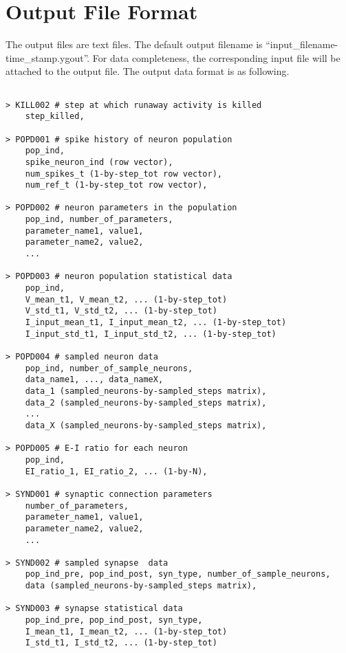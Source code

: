 \documentclass{article}
\begin{document}
\section{Output File Format}
The output files are text files.
The default output filename is ``input\_filename-time\_stamp.ygout''.
For data completeness, the corresponding input file will be attached to the output file.
The output data format is as following.
\begin{lstlisting}

> KILL002 # step at which runaway activity is killed
	step_killed,

> POPD001 # spike history of neuron population
	pop_ind,
	spike_neuron_ind (row vector),
	num_spikes_t (1-by-step_tot row vector),
	num_ref_t (1-by-step_tot row vector),

> POPD002 # neuron parameters in the population
	pop_ind, number_of_parameters,
	parameter_name1, value1,
	parameter_name2, value2,
	...

> POPD003 # neuron population statistical data
	pop_ind,
	V_mean_t1, V_mean_t2, ... (1-by-step_tot)
	V_std_t1, V_std_t2, ... (1-by-step_tot)
	I_input_mean_t1, I_input_mean_t2, ... (1-by-step_tot)
	I_input_std_t1, I_input_std_t2, ... (1-by-step_tot)
	
> POPD004 # sampled neuron data
	pop_ind, number_of_sample_neurons,
	data_name1, ..., data_nameX,
	data_1 (sampled_neurons-by-sampled_steps matrix),
	data_2 (sampled_neurons-by-sampled_steps matrix),
	...
	data_X (sampled_neurons-by-sampled_steps matrix),

> POPD005 # E-I ratio for each neuron
	pop_ind,
	EI_ratio_1, EI_ratio_2, ... (1-by-N),

> SYND001 # synaptic connection parameters
	number_of_parameters,
	parameter_name1, value1,
	parameter_name2, value2,
	...

> SYND002 # sampled synapse  data
	pop_ind_pre, pop_ind_post, syn_type, number_of_sample_neurons,
	data (sampled_neurons-by-sampled_steps matrix),

> SYND003 # synapse statistical data
	pop_ind_pre, pop_ind_post, syn_type,
	I_mean_t1, I_mean_t2, ... (1-by-step_tot)
	I_std_t1, I_std_t2, ... (1-by-step_tot)
	
	

\end{lstlisting}

{}

\end{document}
